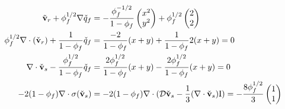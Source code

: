 \begin{equation}
\begin{aligned}
\tilde{\bold{v}}_r + \phi_f^{1/2}\nabla\check{q}_f &= 
-\frac{\phi_f^{-1/2}}{1-\phi_f}\begin{pmatrix}x^2 \\ y^2 \end{pmatrix} + \phi_f^{1/2}\begin{pmatrix} 2 \\ 2 \end{pmatrix}\\
\phi_f^{1/2}\nabla \cdot (\check{\bold{v}}_r) + \frac{1}{1-\phi_f}\check{q}_f  &= \frac{-2}{1-\phi_f}(x+y) + \frac{1}{1-\phi_f}2(x+y)=0\\
\nabla \cdot \check{\bold{v}}_s - \frac{\phi_f^{1/2}}{1-\phi_f}\check{q}_f &= \frac{2\phi_f^{1/2}}{1-\phi_f}(x+y) - \frac{2\phi_f^{1/2}}{1-\phi_f}(x+y) = 0\\
-2(1-\phi_f)\nabla \cdot \sigma(\check{\bold{v}}_s) &= -2(1-\phi_f)\nabla \cdot (\mathcal{D}\check{\bold{v}}_s - \frac{1}{3}(\nabla \cdot \check{\bold{v}}_s) \bold{\text{I}}) = 
-\frac{8\phi_f^{1/2}}{3} \begin{pmatrix} 1 \\ 1 \end{pmatrix}
\end{aligned}
\end{equation}

%
%

%
